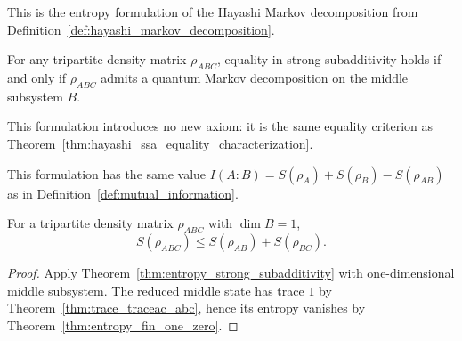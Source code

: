 \begin{definition}
    \label{def:entropy_quantum_markov_decomposition}
    \leanok
    This is the entropy formulation of the Hayashi Markov
    decomposition from Definition~\ref{def:hayashi_markov_decomposition}.
\end{definition}

\begin{theorem}
    \label{thm:entropy_ssa_equality_quantum_markov}
    \leanok
    For any tripartite density matrix $\rho_{ABC}$, equality in strong
    subadditivity holds if and only if $\rho_{ABC}$ admits a quantum
    Markov decomposition on the middle subsystem $B$.

    This formulation introduces no new axiom: it is the same equality
    criterion as Theorem~\ref{thm:hayashi_ssa_equality_characterization}.
\end{theorem}

\begin{definition}\label{def:entropy_mutual_information}
    \leanok
    This formulation has the same value
    $I(A{:}B) = S(\rho_A) + S(\rho_B) - S(\rho_{AB})$
    as in Definition~\ref{def:mutual_information}.
\end{definition}

\begin{theorem}\label{thm:entropy_subadditivity_trivial_B}
    \leanok
    For a tripartite density matrix $\rho_{ABC}$ with
    $\dim B = 1$,
    \[
        S(\rho_{ABC}) \le S(\rho_{AB}) + S(\rho_{BC}).
    \]
\end{theorem}

\begin{proof}\leanok
    Apply Theorem~\ref{thm:entropy_strong_subadditivity} with
    one-dimensional middle subsystem. The reduced middle state has
    trace $1$ by Theorem~\ref{thm:trace_traceac_abc}, hence its entropy
    vanishes by Theorem~\ref{thm:entropy_fin_one_zero}.
\end{proof}

